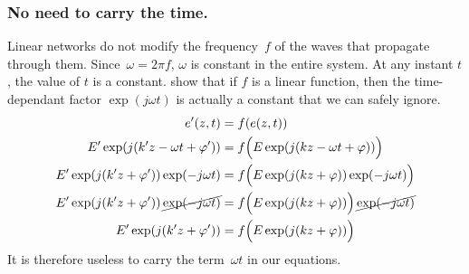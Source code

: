 \subsubsection{No need to carry the time.}
Linear networks do not modify the frequency~$f$ of the waves that propagate through them.
Since~$\omega = 2 \pi f$, $\omega$ is constant in the entire system.
At any instant $t$, the value of $t$ is a constant.
 show that if $f$ is a linear function, then the time-dependant factor $\exp(j\omega t)$ is actually a constant that we can safely ignore.
\begin{align}
    e'(z, t)
    &=
    f(e(z, t))
    \label{eq:factor_out_omegat_0}
    \\
    E' \exp(j(k'z - \omega t + \varphi'))
    &=
    f\Big(
        E \exp(j(kz - \omega t + \varphi))
    \Big)
    \label{eq:factor_out_omegat_1}
    \\
    E' \exp(j(k'z + \varphi'))\exp(-j \omega t)
    &=
    f\Big(
        E \exp(j(kz + \varphi)) \exp(-j \omega t)
    \Big)
    \label{eq:factor_out_omegat_2}
    \\
    E' \exp(j(k'z + \varphi'))
    \,\cancel{
        \exp(-j \omega t)
    }
    &=
    f\Big(
        E \exp(j(kz + \varphi))
    \Big)
    \,\cancel{
        \exp(-j \omega t)
    }
    \label{eq:factor_out_omegat_3}
    \\
    E' \exp(j(k'z + \varphi'))
    &=
    f\Big(
        E \exp(j(kz + \varphi))
    \Big)
    \label{eq:factor_out_omegat_4}
\end{align}
It is therefore useless to carry the term~$\omega t$ in our equations.

